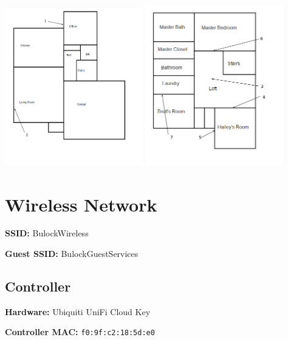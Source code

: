 \documentclass[]{article}
\begin{document}
\begin{multicols}{2}
{\includegraphics[width=0.45\textwidth]{images/main_floor.png}}
{\includegraphics[width=0.45\textwidth]{images/upstairs.png}}

\end{multicols}

\newpage

\vspace{\baselineskip}\section*{Wireless Network}

\textbf{SSID: }
{BulockWireless}

\textbf{Guest SSID: }
{BulockGuestServices}

\subsection{\texorpdfstring{{Controller}}{Controller}}

\textbf{Hardware: }
{Ubiquiti UniFi Cloud Key}

\textbf{Controller MAC: }
\texttt{f0:9f:c2:18:5d:e0}
\end{document}
